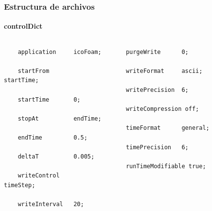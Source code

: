 \begin{frame}[fragile]
    \frametitle{Estructura de archivos}
    \framesubtitle{controlDict}

\vspace{-0.8cm}
    \begin{columns}
        
            
            \begin{block}{}
        
            \footnotesize
            \begin{verbatim}
    application     icoFoam;

    startFrom       startTime;

    startTime       0;

    stopAt          endTime;

    endTime         0.5;

    deltaT          0.005;

    writeControl    timeStep;

    writeInterval   20;    
            \end{verbatim}                
            \end{block}

                
        
            \begin{block}{}

        \footnotesize
        \begin{verbatim}
    purgeWrite      0;

    writeFormat     ascii;

    writePrecision  6;

    writeCompression off;

    timeFormat      general;

    timePrecision   6;

    runTimeModifiable true;               
        \end{verbatim}
                
            \end{block}        

        
    \end{columns}
    


\end{frame} 






